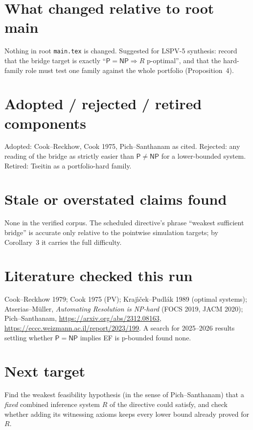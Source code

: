 \documentclass[11pt]{article}
\theoremstyle{remark}
\begin{document}
\section{What changed relative to root main}
Nothing in root \texttt{main.tex} is changed. Suggested for LSPV-5 synthesis:
record that the bridge target is exactly ``$\mathsf P=\mathsf{NP}\Rightarrow R$
p-optimal'', and that the hard-family role must test one family against the whole
portfolio (Proposition~4).

\section{Adopted / rejected / retired components}
Adopted: Cook--Reckhow, Cook 1975, Pich--Santhanam as cited. Rejected: any reading
of the bridge as strictly easier than $\mathsf P\neq\mathsf{NP}$ for a lower-bounded
system. Retired: Tseitin as a portfolio-hard family.

\section{Stale or overstated claims found}
None in the verified corpus. The scheduled directive's phrase ``weakest sufficient
bridge'' is accurate only relative to the pointwise simulation targets; by
Corollary~3 it carries the full difficulty.

\section{Literature checked this run}
Cook--Reckhow 1979; Cook 1975 (PV); Kraj\'{\i}\v{c}ek--Pudl\'ak 1989 (optimal
systems); Atserias--M\"uller, \emph{Automating Resolution is NP-hard} (FOCS 2019,
JACM 2020); Pich--Santhanam, \url{https://arxiv.org/abs/2312.08163},
\url{https://eccc.weizmann.ac.il/report/2023/199}. A search for 2025--2026 results
settling whether $\mathsf P=\mathsf{NP}$ implies EF is p-bounded found none.

\section{Next target}
Find the weakest feasibility hypothesis (in the sense of Pich--Santhanam) that a
\emph{fixed} combined inference system $R$ of the directive could satisfy, and check
whether adding its witnessing axioms keeps every lower bound already proved for $R$.
\end{document}
